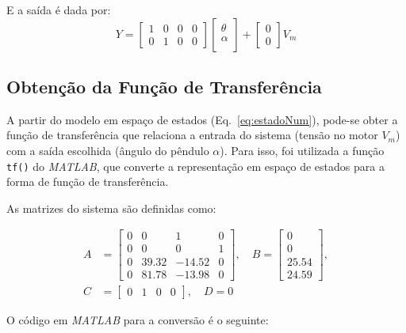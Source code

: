 \documentclass[9pt,a4paper,twocolumn,twoside]{tau-class/tau}
\begin{document}
E a saída é dada por:
\begin{equation}
Y =
\begin{bmatrix}
1 & 0 & 0 & 0 \\
0 & 1 & 0 & 0
\end{bmatrix}
\begin{bmatrix}
\theta \\ \alpha \\ 
\end{bmatrix}
+
\begin{bmatrix}
0 \\ 0
\end{bmatrix} V_m
\end{equation}

\subsection{Obtenção da Função de Transferência}

A partir do modelo em espaço de estados (Eq.~\ref{eq:estadoNum}), pode-se obter a 
função de transferência que relaciona a entrada do sistema (tensão no motor $V_m$) 
com a saída escolhida (ângulo do pêndulo $\alpha$). Para isso, foi utilizada a 
função \texttt{tf()} do \textit{MATLAB}, que converte a representação em espaço 
de estados para a forma de função de transferência.

As matrizes do sistema são definidas como:

\begin{equation}
\begin{split}
A &=
\begin{bmatrix}
0 & 0 & 1 & 0 \\
0 & 0 & 0 & 1 \\
0 & 39.32 & -14.52 & 0 \\
0 & 81.78 & -13.98 & 0
\end{bmatrix}, \quad
B =
\begin{bmatrix}
0 \\ 0 \\ 25.54 \\ 24.59
\end{bmatrix}, \\
C &= 
\begin{bmatrix}
0 & 1 & 0 & 0
\end{bmatrix}, \quad
D = 0
\end{split}
\end{equation}

O código em \textit{MATLAB} para a conversão é o seguinte:
\end{document}
